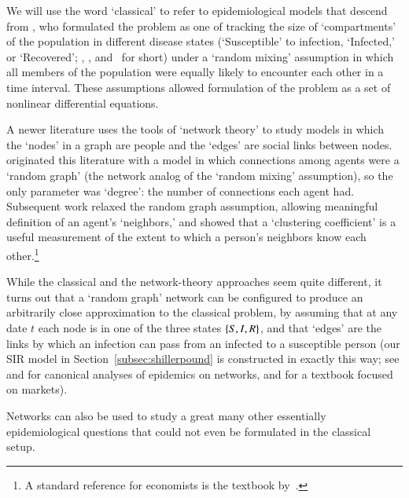 We will use the word `classical' to refer to epidemiological models that descend from \cite{kermack_contribution_1927}, who formulated the problem as one of tracking the size of `compartments' of the population in different disease states (`Susceptible' to infection, `Infected,' or `Recovered'; \Susceptible, \Infected, and \Recovered~for short) under a `random mixing' assumption in which all members of the population were equally likely to encounter each other in a time interval.  These assumptions allowed formulation of the problem as a set of nonlinear differential equations.

A newer literature uses the tools of `network theory' to study models in which the `nodes' in a graph are people and the `edges' are social links between nodes.  \cite{erdos1960evolution} originated this literature with a model in which connections among agents were a `random graph' (the network analog of the `random mixing' assumption), so the only parameter was `degree': the number of connections each agent had.  Subsequent work relaxed the random graph assumption, allowing meaningful definition of an agent's `neighbors,' and showed that a `clustering coefficient' is a useful measurement of the extent to which a person's neighbors know each other.\footnote{A standard reference for economists is the textbook by~\cite{jackson_social_2010}.}



While the classical and the network-theory approaches seem quite different, it turns out that a `random graph' network can be configured to produce an arbitrarily close approximation to the classical problem, by assuming that at any date $t$ each node is in one of the three states $\{S, I, R\}$, and that `edges' are the links by which an infection can pass from an infected to a susceptible person (our SIR model in Section~\ref{subsec:shillerpound} is constructed in exactly this way; see \cite{newman2002spread} and \cite{jackson_social_2010} for canonical analyses of epidemics on networks, and \cite{easley_kleinberg_2010} for a textbook focused on markets).

Networks can also be used to study a great many other essentially epidemiological questions that could not even be formulated in the classical setup. %

